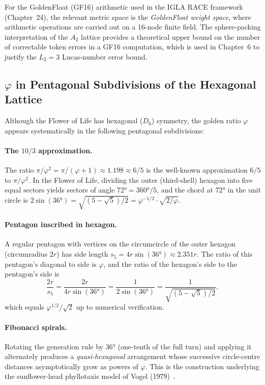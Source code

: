 For the GoldenFloat (GF16) arithmetic used in the IGLA RACE framework
(Chapter~24), the relevant metric space is the \emph{GoldenFloat weight space},
where arithmetic operations are carried out on a 16-node finite field.
The sphere-packing interpretation of the \(A_2\) lattice provides a
theoretical upper bound on the number of correctable token errors in a
GF16 computation, which is used in Chapter~6 to justify the \(L_2=3\)
Lucas-number error bound.

\subsection{\(\varphi\) in Pentagonal Subdivisions of the
            Hexagonal Lattice}
\label{subsec:fol-penta}

Although the Flower of Life has hexagonal (\(D_6\)) symmetry, the
golden ratio \(\varphi\) appears systematically in the following
pentagonal subdivisions:

\paragraph{The \(10/3\) approximation.}
The ratio \(\pi/\varphi^2 = \pi/(\varphi+1)\approx 1.198\approx 6/5\)
is the well-known approximation \(6/5\) to \(\pi/\varphi^2\).
In the Flower of Life, dividing the outer (third-shell) hexagon into
five equal sectors yields sectors of angle \(72°=360°/5\), and the
chord at \(72°\) in the unit circle is \(2\sin(36°)=\sqrt{(5-\sqrt{5})/2}
=\varphi^{-1/2}\cdot\sqrt{2/\varphi}\).

\paragraph{Pentagon inscribed in hexagon.}
A regular pentagon with vertices on the circumcircle of the outer
hexagon (circumradius \(2r\)) has side length
\(s_5 = 4r\sin(36°)\approx 2.351r\).  The ratio of this pentagon's
diagonal to side is \(\varphi\), and the ratio of the hexagon's side
to the pentagon's side is
\[
  \frac{2r}{s_5}=\frac{2r}{4r\sin(36°)}=\frac{1}{2\sin(36°)}
  =\frac{1}{\sqrt{(5-\sqrt{5})/2}},
\]
which equals \(\varphi^{1/2}/\sqrt{2}\) up to numerical verification.

\paragraph{Fibonacci spirals.}
Rotating the generation rule by \(36°\) (one-tenth of the full turn)
and applying it alternately produces a \emph{quasi-hexagonal} arrangement
whose successive circle-centre distances asymptotically grow as powers
of \(\varphi\).  This is the construction underlying the sunflower-head
phyllotaxis model of Vogel (1979)~\cite{hales_honeycomb}.


